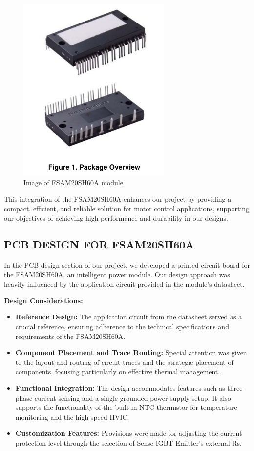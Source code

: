 \begin{figure}[H]
    \centering
    \includegraphics[width=3in]{sections/section4/images/IPM/ipm.png}
    \caption{Image of FSAM20SH60A module}
\end{figure}

This integration of the FSAM20SH60A enhances our project by providing a compact, efficient, and reliable solution for motor control applications, supporting our objectives of achieving high performance and durability in our designs.


\subsection{PCB DESIGN FOR FSAM20SH60A}

In the PCB design section of our project, we developed a printed circuit board for the FSAM20SH60A, an intelligent power module. Our design approach was heavily influenced by the application circuit provided in the module's datasheet.

\textbf{Design Considerations:}
\begin{itemize}
    \item \textbf{Reference Design:} The application circuit from the datasheet served as a crucial reference, ensuring adherence to the technical specifications and requirements of the FSAM20SH60A.
    \item \textbf{Component Placement and Trace Routing:} Special attention was given to the layout and routing of circuit traces and the strategic placement of components, focusing particularly on effective thermal management.
    \item \textbf{Functional Integration:} The design accommodates features such as three-phase current sensing and a single-grounded power supply setup. It also supports the functionality of the built-in NTC thermistor for temperature monitoring and the high-speed HVIC.
    \item \textbf{Customization Features:} Provisions were made for adjusting the current protection level through the selection of Sense-IGBT Emitter's external Rs.
\end{itemize}

